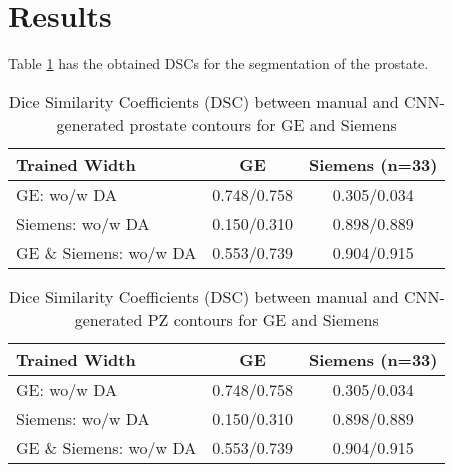 \section{Results}

Table \ref{tab:res_prost} has the obtained DSCs for the segmentation of the prostate. 
\begin{table}
    \centering
    \begin{tabular}{|l|c|c|}
         \hline
          \textbf{Trained Width} &  GE & Siemens (n=33) \\
         \hline
         GE: wo/w DA & 0.748/0.758 & 0.305/0.034 \\
         \hline
         Siemens: wo/w DA & 0.150/0.310 & 0.898/0.889\\
         \hline
         GE \& Siemens: wo/w DA & 0.553/0.739 & 0.904/0.915\\
         \hline
    \end{tabular}
    \caption{Dice Similarity Coefficients (DSC) between manual and CNN-generated 
    prostate contours for GE and Siemens}
    \label{tab:res_prost}
\end{table}


\begin{table}
    \centering
    \begin{tabular}{|l|c|c|}
        \hline
         \textbf{Trained Width} &  GE & Siemens (n=33) \\
         \hline
         GE: wo/w DA & 0.748/0.758 & 0.305/0.034 \\
         \hline
         Siemens: wo/w DA & 0.150/0.310 & 0.898/0.889\\
         \hline
         GE \& Siemens: wo/w DA & 0.553/0.739 & 0.904/0.915\\
         \hline
    \end{tabular}
    \caption{Dice Similarity Coefficients (DSC) between manual and CNN-generated 
    PZ contours for GE and Siemens}
    \label{tab:res_pz}
\end{table}
